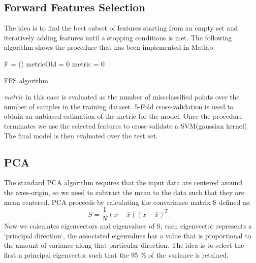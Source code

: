 \documentclass[a4paper,10pt]{article}
\begin{document}
  \subsection{Forward Features Selection}
    The idea is to find the best subset of features starting from an empty set and iteratively adding features
    until a stopping conditions is met.\newline
    The following algorithm shows the procedure that has been implemented in Matlab:\newline\newline
    \begin{algorithm}[H]
      F = ()\;
      metricOld = 0\;
      metric = 0\;
      \caption{FFS algorithm}
    \end{algorithm}
    
    \noindent \textit{metric} in this case is evaluated as the number of missclassified points over the number of samples in the training dataset.
    5-Fold cross-validation is used to obtain an unbiased estimation of the metric for the model.\newline
    Once the procedure terminates we use the selected features to cross-validate a SVM(gaussian kernel). 
    The final model is then evaluated over the test set.
  
  \subsection{PCA}
    The standard PCA algorithm requires that the input data are centered around the axes-origin, so we need to subtract the mean to the data such that 
    they are mean centered.\newline
    PCA proceeds by calculating the convariance matrix S defined as:
    \begin{equation}
     S = \frac{1}{N} (x - \bar{x})(x - \bar{x})^T
    \end{equation}
    Now we calculates eigenvectors and eigenvalues of S; each eigenvector represents a `principal direction`, the associated eigenvalues has a 
    value that is proportional to the amount of variance along that particular direction. The idea is to select the first n principal eigenvector 
    such that the 95 \% of the variance is retained.
\end{document}
